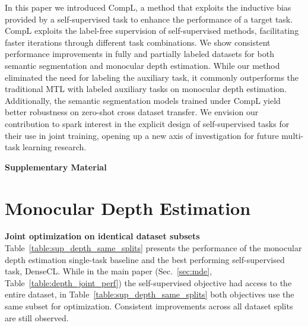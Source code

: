 \documentclass[10pt,twocolumn,letterpaper]{article}
\newcommand{\parsection}[1]{\vspace{1mm}\noindent\textbf{#1 }}
\begin{document}
In this paper we introduced CompL, a method that exploits the inductive bias provided by a self-supervised task to enhance the performance of a target task. 
CompL exploits the label-free supervision of self-supervised methods, facilitating faster iterations through different task combinations.
We show consistent performance improvements in fully and partially labeled datasets for both semantic segmentation and monocular depth estimation.
While our method eliminated the need for labeling the auxiliary task, it commonly outperforms the traditional MTL with labeled auxiliary tasks on monocular depth estimation.
Additionally, the semantic segmentation models trained under CompL yield better robustness on zero-shot cross dataset transfer. 
We envision our contribution to spark interest in the explicit design of self-supervised tasks for their use in joint training, opening up a new axis of investigation for future multi-task learning research.
 
\newpage

\renewcommand\thefigure{S.\arabic{figure}}    
\renewcommand\thetable{S.\arabic{table}}   

\begin{center}
	\textbf{\Large Supplementary Material}
\end{center}
\appendix

\section{Monocular Depth Estimation}

\parsection{Joint optimization on identical dataset subsets}
Table~\ref{table:sup_depth_same_splits} presents the performance of the monocular depth estimation single-task baseline and the best performing self-supervised task, DenseCL. While in the main paper 
(Sec.~\ref{sec:mde}, Table~\ref{table:depth_joint_perf}) 
the self-supervised objective had access to the entire dataset, in Table~\ref{table:sup_depth_same_splits} both objectives use the same subset for optimization. Consistent improvements across all dataset splits are still observed.

\begin{table}[ht]
  \center
    \caption{Monocular depth estimation performance in RMSE on NYUD-v2.
  Both supervised and self-supervised objectives use identical splits. CompL denotes the addition of the best performing self-supervised objective, DenseCL, and yields consistent improvements.}
  \vspace{-0.1in}
  \label{table:sup_depth_same_splits}
\end{table}
\end{document}
